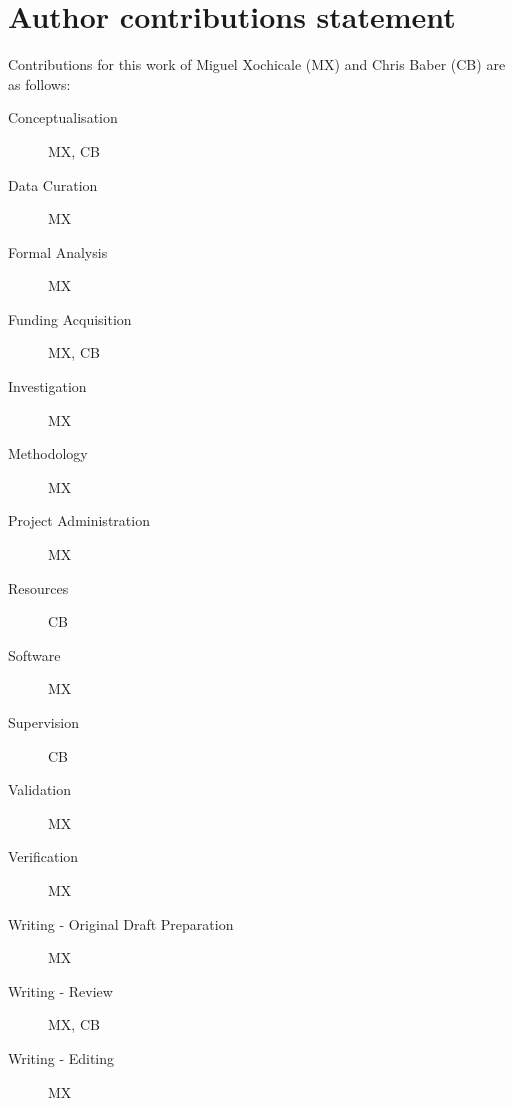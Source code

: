 \documentclass[fleqn,10pt]{wlscirep}
\begin{document}
\section*{Author contributions statement}
Contributions for this work of Miguel Xochicale (MX) and Chris Baber (CB) are as follows:
\begin{description}
\item[Conceptualisation] MX, CB
\item[Data Curation] MX
\item[Formal Analysis] MX
\item[Funding Acquisition] MX, CB
\item[Investigation] MX
\item[Methodology] MX
\item[Project Administration] MX
\item[Resources] CB
\item[Software] MX
\item[Supervision] CB
\item[Validation] MX
\item[Verification] MX
\item[Writing - Original Draft Preparation] MX
\item[Writing - Review] MX, CB
\item[Writing - Editing] MX
\end{description}

\end{document}
